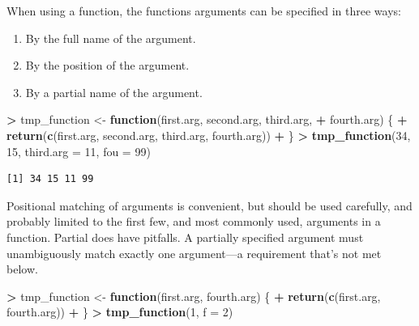\documentclass[]{krantz}
\makeatletter
\newenvironment{Shaded}{\begin{snugshade}}{\end{snugshade}}
\newcommand{\ControlFlowTok}[1]{\textcolor[rgb]{0.27,0.27,0.27}{\textbf{#1}}}
\newcommand{\DataTypeTok}[1]{\textcolor[rgb]{0.27,0.27,0.27}{#1}}
\newcommand{\DecValTok}[1]{\textcolor[rgb]{0.06,0.06,0.06}{#1}}
\newcommand{\KeywordTok}[1]{\textcolor[rgb]{0.27,0.27,0.27}{\textbf{#1}}}
\newcommand{\NormalTok}[1]{#1}
\newcommand{\OperatorTok}[1]{\textcolor[rgb]{0.43,0.43,0.43}{\textbf{#1}}}
\newcommand{\StringTok}[1]{\textcolor[rgb]{0.5,0.5,0.5}{#1}}
\providecommand{\tightlist}{%
  \setlength{\itemsep}{0pt}\setlength{\parskip}{0pt}}
\newenvironment{kframe}{%
\medskip{}
\setlength{\fboxsep}{.8em}
 \def\at@end@of@kframe{}%
 \ifinner\ifhmode%
  \def\at@end@of@kframe{\end{minipage}}%
  \begin{minipage}{\columnwidth}%
 \fi\fi%
 \def\FrameCommand##1{\hskip\@totalleftmargin \hskip-\fboxsep
 \colorbox{shadecolor}{##1}\hskip-\fboxsep
     \hskip-\linewidth \hskip-\@totalleftmargin \hskip\columnwidth}%
 \MakeFramed {\advance\hsize-\width
   \@totalleftmargin\z@ \linewidth\hsize
   \@setminipage}}%
 {\par\unskip\endMakeFramed%
 \at@end@of@kframe}
\renewenvironment{Shaded}{\begin{kframe}}{\end{kframe}}
\makeatother
\begin{document}
When using a function, the functions arguments can be specified in three ways:

\begin{enumerate}
\def\labelenumi{\arabic{enumi}.}
\tightlist
\item
  By the full name of the argument.
\item
  By the position of the argument.
\item
  By a partial name of the argument.
\end{enumerate}

\begin{Shaded}
\begin{Highlighting}[]
\OperatorTok{>}\StringTok{ }\NormalTok{tmp_function <-}\StringTok{ }\ControlFlowTok{function}\NormalTok{(first.arg, second.arg, third.arg, }
\OperatorTok{+}\StringTok{   }\NormalTok{fourth.arg) \{}
\OperatorTok{+}\StringTok{   }\KeywordTok{return}\NormalTok{(}\KeywordTok{c}\NormalTok{(first.arg, second.arg, third.arg, fourth.arg))}
\OperatorTok{+}\StringTok{ }\NormalTok{\}}
\OperatorTok{>}\StringTok{ }\KeywordTok{tmp_function}\NormalTok{(}\DecValTok{34}\NormalTok{, }\DecValTok{15}\NormalTok{, }\DataTypeTok{third.arg =} \DecValTok{11}\NormalTok{, }\DataTypeTok{fou =} \DecValTok{99}\NormalTok{)}
\end{Highlighting}
\end{Shaded}

\begin{verbatim}
[1] 34 15 11 99
\end{verbatim}

Positional matching of arguments is convenient, but should be used carefully, and probably limited to the first few, and most commonly used, arguments in a function. Partial does have pitfalls. A partially specified argument must unambiguously match exactly one argument---a requirement that's not met below.

\begin{Shaded}
\begin{Highlighting}[]
\OperatorTok{>}\StringTok{ }\NormalTok{tmp_function <-}\StringTok{ }\ControlFlowTok{function}\NormalTok{(first.arg, fourth.arg) \{}
\OperatorTok{+}\StringTok{   }\KeywordTok{return}\NormalTok{(}\KeywordTok{c}\NormalTok{(first.arg, fourth.arg))}
\OperatorTok{+}\StringTok{ }\NormalTok{\}}
\OperatorTok{>}\StringTok{ }\KeywordTok{tmp_function}\NormalTok{(}\DecValTok{1}\NormalTok{, }\DataTypeTok{f =} \DecValTok{2}\NormalTok{)}
\end{Highlighting}
\end{Shaded}
\end{document}
